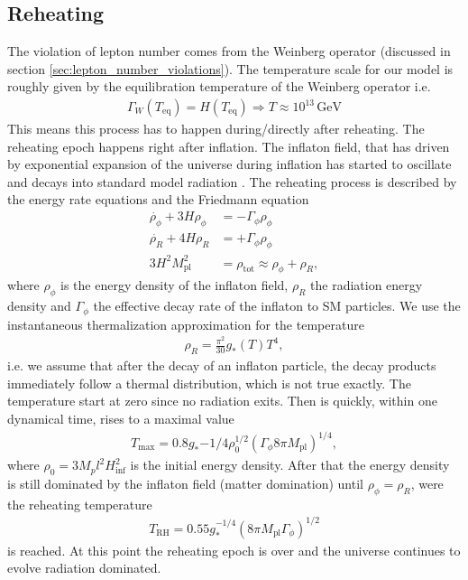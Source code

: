 \documentclass[13pt,a4paper,titlepage]{article}
\begin{document}
\subsection{Reheating}
\label{sec:reheating}
The violation of lepton number comes from the Weinberg operator (discussed in section \ref{sec:lepton_number_violations}).
The temperature scale for our model is roughly given by the equilibration temperature of the Weinberg operator i.e.
\begin{align}
    \Gamma_W(T_\mathrm{eq}) = H(T_\mathrm{eq}) \Rightarrow T \approx 10^{13} \, \mathrm{GeV}
\end{align}
This means this process has to happen during/directly after reheating. The reheating epoch happens right after inflation. The inflaton field, that has driven by exponential expansion of the universe during inflation has started to oscillate and decays into standard model radiation  \cite[sec. 8.3]{the_early_universe_kolb_and_turner}.
The reheating process is described by the energy rate equations and the Friedmann equation \cite[eq. 8.29, 8.31]{the_early_universe_kolb_and_turner}
\begin{align}
    \label{eq:reheating_equations}
    \dot{\rho_\phi} + 3 H \rho_\phi &= - \Gamma_\phi \rho_\phi \\
    \dot{\rho_R} + 4 H \rho_R &= + \Gamma_\phi \rho_\phi \\
    3 H^2 M_\mathrm{pl}^2 &= \rho_\mathrm{tot} \approx \rho_\phi + \rho_R,
\end{align}
where $\rho_\phi$ is the energy density of the inflaton field, $\rho_R$ the radiation energy density and $\Gamma_\phi$ the effective decay rate of the inflaton to SM particles.
We use the instantaneous thermalization approximation for the temperature
\begin{align}
    \rho_R = \frac{\pi^2}{30} g_{*}(T) T^4,
\end{align}
i.e. we assume that after the decay of an inflaton particle, the decay products immediately follow a thermal distribution, which is not true exactly.
The temperature start at zero since no radiation exits. Then is quickly, within one dynamical time, rises to a maximal
value \cite[eq. 8.33]{the_early_universe_kolb_and_turner}
\begin{align}
    T_\mathrm{max} = 0.8 g_*{-1/4} \rho_0^{1/2} (\Gamma_\phi 8 \pi M_\mathrm{pl})^{1/4},
\end{align}
where $\rho_0 = 3 M_pl^2 H_\mathrm{inf}^2$ is the initial energy density.
After that the energy density is still dominated by the inflaton field (matter domination) until
$\rho_\phi = \rho_R$, were the reheating temperature \cite[eq. 8.34]{the_early_universe_kolb_and_turner}
\begin{align}
    T_\mathrm{RH} = 0.55 g_*^{-1/4} (8 \pi M_\mathrm{pl} \Gamma_\phi)^{1/2}
\end{align}
is reached. At this point the reheating epoch is over and the universe continues to evolve radiation dominated.
\end{document}
